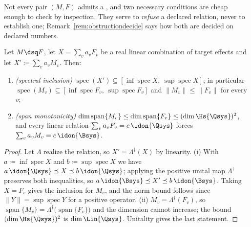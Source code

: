 
Not every pair $(M,F)$ admits a , and two necessary
conditions are cheap enough to check by inspection. They serve to
\emph{refuse} a declared relation, never to establish one;
Remark~\ref{rem:obstructiondecide} says how both are decided on declared
numbers.

\begin{lemma}\label{lem:obstructions}
Let $M\dsq F$, let $X=\sum_{v}a_{v}F_{v}$ be a real linear combination of
target effects and let $X'\coloneqq\sum_{v}a_{v}M_{v}$. Then:
\begin{enumerate}[label=(\roman*),leftmargin=3.0em]
\item \emph{(spectral inclusion)}
  $\operatorname{spec}(X')\subseteq[\inf\operatorname{spec}X,\
  \sup\operatorname{spec}X]$; in particular
  $\operatorname{spec}(M_v)\subseteq[\inf\operatorname{spec}F_v,\
  \sup\operatorname{spec}F_v]$ and $\|M_v\|\le\|F_v\|$ for every $v$;
\item \emph{(span monotonicity)}
  $\dim\operatorname{span}\{M_v\}\le\dim\operatorname{span}\{F_v\}
  \le(\dim\Hs{\Qsys})^{2}$, and every linear relation
  $\sum_va_vF_v=c\,\idon{\Qsys}$ forces $\sum_va_vM_v=c\,\idon{\Bsys}$.
\end{enumerate}
\end{lemma}

\begin{proof}
Let $\Lambda$ realize the relation, so $X'=\Lambda^{\dagger}(X)$ by linearity.
(i) With $a\coloneqq\inf\operatorname{spec}X$ and
$b\coloneqq\sup\operatorname{spec}X$ we have
$a\,\idon{\Qsys}\preceq X\preceq b\,\idon{\Qsys}$; applying the positive unital
map $\Lambda^{\dagger}$ preserves both inequalities, so
$a\,\idon{\Bsys}\preceq X'\preceq b\,\idon{\Bsys}$. Taking $X=F_v$ gives the
inclusion for $M_v$, and the norm bound follows since
$\|Y\|=\sup\operatorname{spec}Y$ for a positive operator.
(ii) $M_v=\Lambda^{\dagger}(F_v)$, so
$\operatorname{span}\{M_v\}=\Lambda^{\dagger}\big(\operatorname{span}\{F_v\}\big)$
and the dimension cannot increase; the bound
$(\dim\Hs{\Qsys})^{2}$ is $\dim\Lin{\Qsys}$. Unitality gives the last
statement.
\end{proof}
